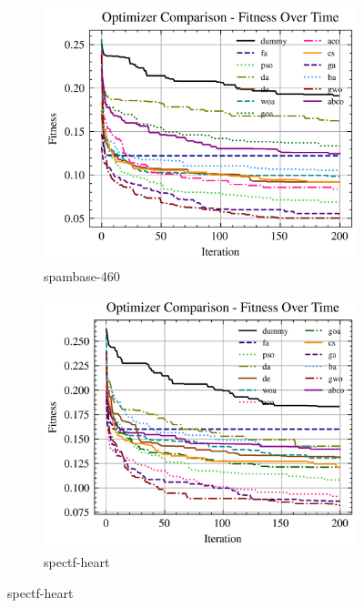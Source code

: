\begin{figure}[htp]
    \centering
    \begin{subfigure}[htp]{0.45\textwidth}
        \includegraphics[width=\textwidth]{imagenes/fitness_charts/img/binary/spambase-460/optimizers_fitness_knn.png}
        \caption{spambase-460}
    \end{subfigure}
    \begin{subfigure}[htp]{0.45\textwidth}
        \includegraphics[width=\textwidth]{imagenes/fitness_charts/img/binary/spectf-heart/optimizers_fitness_knn.png}
        \caption{spectf-heart}
    \end{subfigure}


\end{figure}
